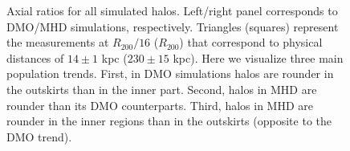 \documentclass[usenatbib]{mnras}
\begin{document}
 
\begin{figure}
\begin{center}
\end{center}
\caption{Axial ratios for all simulated halos.
  Left/right panel corresponds to DMO/MHD simulations, respectively.
  Triangles (squares) represent the measurements at $R_{200}/16$
  ($R_{200}$) that correspond to physical distances of $14\pm 1$ kpc
  ($230\pm 15$ kpc).
  Here we visualize three main population trends.
  First, in DMO simulations halos are rounder in the outskirts
  than in the inner part.
  Second, halos in MHD are rounder than its DMO counterparts.
  Third, halos in MHD are rounder in the inner regions than in
  the outskirts (opposite to the DMO trend).}
  \label{fig:triaxiality_plane}
\end{figure}
\end{document}
